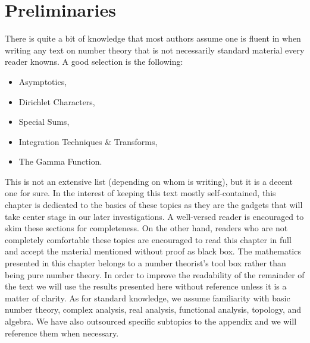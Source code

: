   \chapter{Preliminaries}\label{ch:Preliminaries}
    There is quite a bit of knowledge that most authors assume one is fluent in when writing any text on number theory that is not necessarily standard material every reader knowns. A good selection is the following:
    \begin{itemize}
      \item Asymptotics,
      \item Dirichlet Characters,
      \item Special Sums,
      \item Integration Techniques \& Transforms,
      \item The Gamma Function.
    \end{itemize}
    This is not an extensive list (depending on whom is writing), but it is a decent one for sure. In the interest of keeping this text mostly self-contained, this chapter is dedicated to the basics of these topics as they are the gadgets that will take center stage in our later investigations. A well-versed reader is encouraged to skim these sections for completeness. On the other hand, readers who are not completely comfortable these topics are encouraged to read this chapter in full and accept the material mentioned without proof as black box. The mathematics presented in this chapter belongs to a number theorist's tool box rather than being pure number theory. In order to improve the readability of the remainder of the text we will use the results presented here without reference unless it is a matter of clarity. As for standard knowledge, we assume familiarity with basic number theory, complex analysis, real analysis, functional analysis, topology, and algebra. We have also outsourced specific subtopics to the appendix and we will reference them when necessary.
